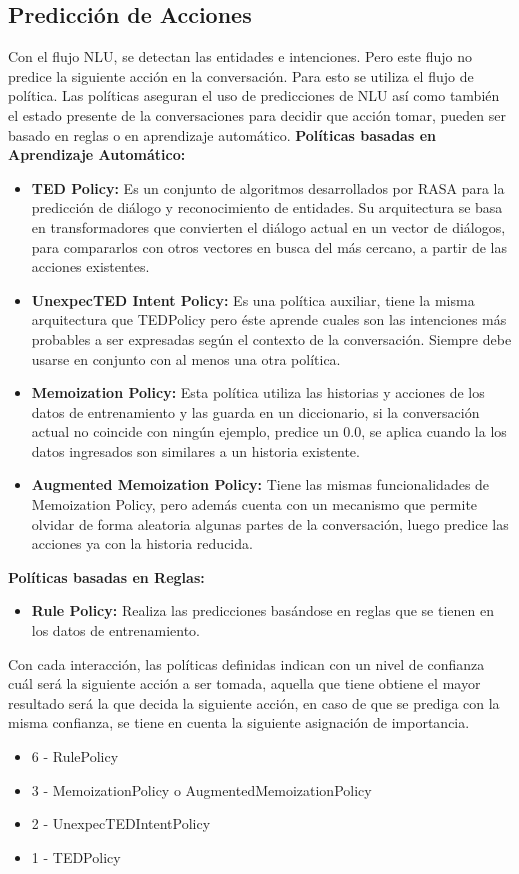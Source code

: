  \subsection{Predicción de Acciones}
Con el flujo NLU, se detectan las entidades e intenciones. Pero este flujo no predice la siguiente acción en la 
conversación. Para esto se utiliza el flujo de política. Las políticas aseguran el uso de predicciones de NLU así como 
también el estado presente de la conversaciones para decidir que acción tomar, pueden ser basado en reglas o en aprendizaje automático.
\textbf{Políticas basadas en Aprendizaje Automático:}
\begin{itemize}
    \item \textbf{TED Policy:}
    Es un conjunto de algoritmos desarrollados por RASA para la predicción de diálogo y reconocimiento de entidades. Su arquitectura se basa en transformadores que convierten el diálogo actual en un vector de diálogos, para compararlos con otros vectores en busca del más cercano, a partir de las acciones existentes.\cite{TED_Policy}
    \item \textbf{UnexpecTED Intent Policy:} Es una política auxiliar, tiene la misma arquitectura que TEDPolicy pero éste aprende cuales son las intenciones más probables a ser expresadas según el contexto de la conversación. Siempre debe usarse en conjunto con al menos una otra política.\cite{UnexpecTED}
    \item \textbf{Memoization Policy: }Esta política utiliza las historias y acciones de los datos de entrenamiento y las guarda en un diccionario, si la conversación actual no coincide con ningún ejemplo, predice un 0.0, se aplica cuando la los datos ingresados son similares a un historia existente.\cite{MemoizationPolicy}
    \item \textbf{Augmented Memoization Policy: } Tiene las mismas funcionalidades de Memoization Policy, pero además cuenta con un mecanismo que permite olvidar de forma aleatoria algunas partes de la conversación, luego predice las acciones ya con la historia reducida.\cite{AugmentedMemoizationPolicy}
\end{itemize}
\textbf{Políticas basadas en Reglas:}
\begin{itemize}
    \item \textbf{Rule Policy:} Realiza las predicciones basándose en reglas que se tienen en los datos de entrenamiento.
\end{itemize}
\indent Con cada interacción, las políticas definidas indican con un nivel de confianza cuál será la siguiente acción a ser tomada, aquella que tiene obtiene el mayor resultado será la que decida la siguiente acción, en caso de que se prediga con la misma confianza, se tiene en cuenta la siguiente asignación de importancia.
\begin{itemize}
    \item 6 - RulePolicy
    \item 3 - MemoizationPolicy o AugmentedMemoizationPolicy
    \item 2 -  UnexpecTEDIntentPolicy
    \item 1 - TEDPolicy
\end{itemize}
